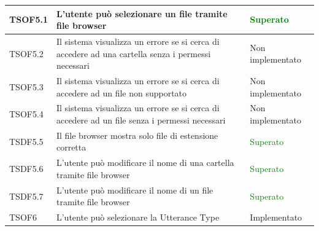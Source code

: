 \documentclass[openany,12pt,a4paper]{report}
\begin{document}
\begin{longtable}{| p{2cm} |p{8cm} | p{2.5cm} |}
	\newline TSOF5.1&
	\newline L'utente può selezionare un file tramite file browser&
	\newline \textcolor{green}{Superato}
	\\[1em]	
	\hline
	
	\newline TSOF5.2&
	\newline Il sistema visualizza un errore se si cerca di accedere ad una cartella senza i permessi necessari&
	\newline Non implementato
	\\[1em]	
	\hline
	
	\newline TSOF5.3&
	\newline Il sistema visualizza un errore se si cerca di accedere ad un file non supportato&
	\newline Non implementato
	\\[1em]	
	\hline
	
	\newline TSOF5.4&
	\newline Il sistema visualizza un errore se si cerca di accedere ad un file senza i permessi necessari&
	\newline Non implementato
	\\[1em]	
	\hline
	
	\newline TSDF5.5&
	\newline Il file browser mostra solo file di estensione corretta&
	\newline \textcolor{green}{Superato}
	\\[1em]
	\hline
	\newline TSDF5.6&
	\newline L'utente può modificare il nome di una cartella tramite file browser&
	\newline \textcolor{green}{Superato}
	\\[1em]
	\hline
	\newline TSDF5.7&
	\newline L'utente può modificare il nome di un file tramite file browser&
	\newline \textcolor{green}{Superato}
	\\[1em]
	\hline
	\newline TSOF6&
	\newline L'utente può selezionare la Utterance Type&
	\newline Implementato
	\\[1em]
	\hline
	

\end{longtable}
\end{document}
